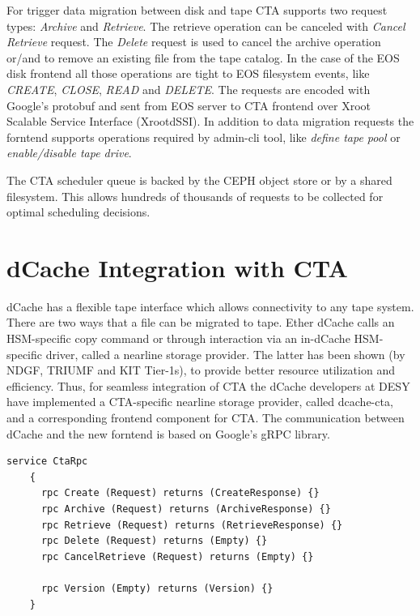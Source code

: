 \documentclass{webofc}
\begin{document}
For trigger data migration between disk and tape CTA supports two request types: \textit{Archive} and \textit{Retrieve}. The retrieve operation can be canceled with \textit{Cancel Retrieve} request. The \textit{Delete} request is used to cancel the archive operation or/and to remove an existing file from the tape catalog. In the case of the EOS disk frontend all those operations are tight to EOS filesystem events, like \textit{CREATE}, \textit{CLOSE}, \textit{READ} and \textit{DELETE}. The requests are encoded with Google's protobuf \cite{prtobuf} and sent from EOS server to CTA frontend over Xroot Scalable Service Interface (XrootdSSI). In addition to data migration requests the forntend supports operations required by admin-cli tool, like \textit{define tape pool} or \textit{enable/disable tape drive}.

The CTA scheduler queue is backed by the CEPH object store or by a shared filesystem. This allows hundreds of thousands of requests to be collected for optimal scheduling decisions.

\section{dCache Integration with CTA}
\label{sec:integration}

dCache has a flexible tape interface which allows connectivity to any tape system. There are two ways that a file can be migrated to tape. Ether dCache calls an HSM-specific copy command or through interaction via an in-dCache HSM-specific driver, called a nearline storage provider. The latter has been shown (by NDGF, TRIUMF and KIT Tier-1s), to provide better resource utilization and efficiency\cite{endit_kit}. Thus, for seamless integration of CTA the dCache developers at DESY have implemented a CTA-specific nearline storage provider, called dcache-cta\cite{dcache_cta}, and a corresponding frontend component for CTA. The communication between dCache and the new forntend is based on Google’s gRPC library.

\begin{lstlisting}[label=grpc-frontend,caption={gRPC service definition},keywords={service,rpc,returns}]
    service CtaRpc
    {
      rpc Create (Request) returns (CreateResponse) {}
      rpc Archive (Request) returns (ArchiveResponse) {}
      rpc Retrieve (Request) returns (RetrieveResponse) {}
      rpc Delete (Request) returns (Empty) {}
      rpc CancelRetrieve (Request) returns (Empty) {}
    
      rpc Version (Empty) returns (Version) {}
    }
\end{lstlisting}
\end{document}
